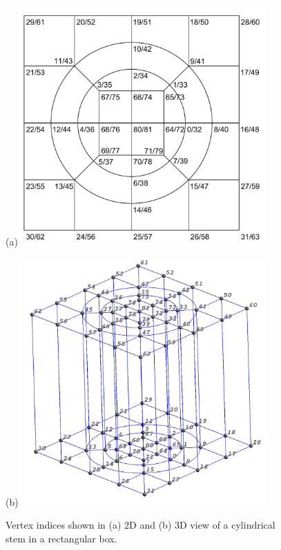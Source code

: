 \vfill\newpage %
\begin{figure}[H]
\begin{centering}
(a)\includegraphics[width=3.75in]{Figures/2D-Labeled-Cube}
\par\end{centering}
\begin{centering}
(b)\includegraphics[width=3.75in]{Figures/3D-Labeled-Cube3-Size30Font4b}
\par\end{centering}
\caption{\label{fig:blockMesh}Vertex indices shown in (a) 2D and (b) 3D view
of a cylindrical stem in a rectangular box.}
\end{figure}


